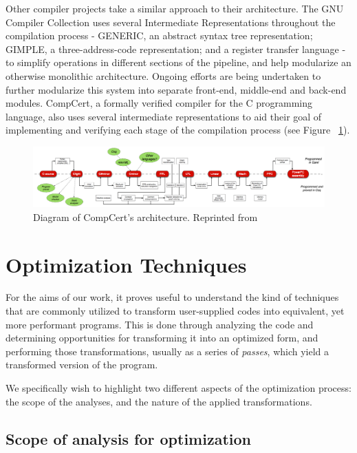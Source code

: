 Other compiler projects take a similar approach to their architecture. The GNU Compiler Collection uses several Intermediate Representations throughout the compilation process \cite{Novillo2004} - GENERIC, an abstract syntax tree representation; GIMPLE, a three-address-code representation; and a register transfer language - to simplify operations in different sections of the pipeline, and help modularize an otherwise monolithic architecture. Ongoing efforts \cite{GCCRearch} are being undertaken to further modularize this system into separate front-end, middle-end and back-end modules.
CompCert\cite{Leroy2009Compiler}, a formally verified compiler for the C programming language, also uses several intermediate representations to aid their goal of implementing and verifying each stage of the compilation process (see Figure ~\ref{fig:compcert_arch}).

\begin{figure}
    \centering
    \includegraphics[width=\textwidth]{figures/compcert_arch.png}
    \caption{Diagram of CompCert's architecture. Reprinted from \cite{CompCertHome}}
    \label{fig:compcert_arch}
\end{figure}

\section{Optimization Techniques}

For the aims of our work, it proves useful to understand the kind of techniques that are commonly utilized to transform user-supplied codes into equivalent, yet more performant programs. This is done through analyzing the code and determining opportunities for transforming it into an optimized form, and performing those transformations, usually as a series of \textit{passes}, which yield a transformed version of the program.

We specifically wish to highlight two different aspects of the optimization process: the scope of the analyses, and the nature of the applied transformations.

\subsection{Scope of analysis for optimization}

